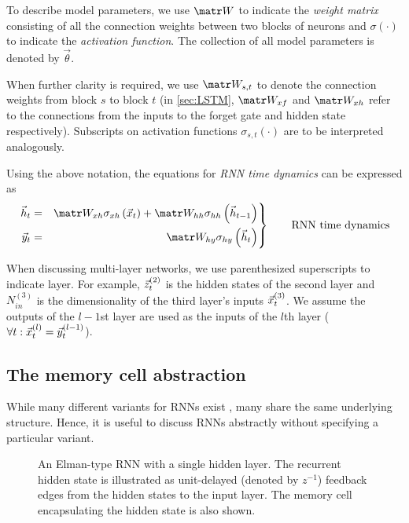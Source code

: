 To describe model parameters, we use $\W$ to indicate the \emph{weight matrix}
consisting of all the connection weights between two blocks of neurons
and $\sigma(\cdot)$ to indicate the \emph{activation function}. The collection
of all model parameters is denoted by $\vec{\theta}$.

When further clarity is required, we use $\W_{s,t}$ to denote the connection
weights from block $s$ to block $t$ (\ie in \cref{sec:LSTM}, $\W_{xf}$ and
$\W_{xh}$ refer to the connections from the inputs to the forget gate and
hidden state respectively). Subscripts on activation functions $\sigma_{s,t}(\cdot)$
are to be interpreted analogously.

Using the above notation, the equations for \emph{RNN time dynamics} can be expressed as
\begin{equation}\label{eq:rnn-dynamics}
 \left.\begin{aligned}
          \h_t &=& \W_{xh} \sigma_{xh} \left( \x_t \right) + \W_{hh} \sigma_{hh} \left( \h_{t-1} \right)\\
          \y_t &=& \W_{hy} \sigma_{hy} \left( \h_t \right)
       \end{aligned}
 \right\}
 \qquad \text{RNN time dynamics}
\end{equation}

When discussing multi-layer networks, we use parenthesized superscripts to
indicate layer. For example, $\vec{z}^{(2)}_t$ is the hidden states of the second
layer and $N^{(3)}_{in}$ is the dimensionality of the third layer's inputs
$\vec{x}^{(3)}_t$. We assume the outputs of the $l-1$st layer are used as the inputs
of the $l$th layer (\ie $\forall t: \vec{x}^{(l)}_t = \vec{y}^{(l-1)}_t$).

\subsection{The memory cell abstraction}

While many different variants for RNNs exist
\citep{elman1990finding,jordan1997serial,hochreiter1997long,cho2014learning,Koutnik2014,Mikolov2015},
many share the same underlying structure. Hence, it is useful to discuss RNNs
abstractly without specifying a particular variant.

\begin{figure}[tb]
  \centering
  
  \caption{An Elman-type RNN with a single hidden layer. The recurrent hidden
    state is illustrated as unit-delayed (denoted by $z^{-1}$) feedback edges
    from the hidden states to the input layer. The memory cell encapsulating the
  hidden state is also shown.}
  \label{fig:rnn-elman}
\end{figure}

